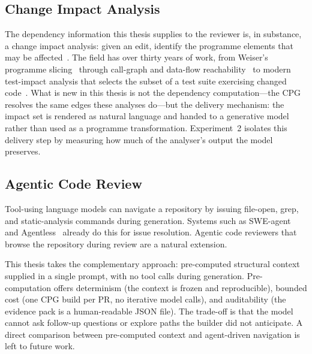 \subsection{Change Impact Analysis}
\label{sec:sota-cia}

The dependency information this thesis supplies to the reviewer is, in
substance, a change impact analysis: given an edit, identify the programme
elements that may be affected~\cite{bohner1996cia}. The field has over
thirty years of work, from Weiser's programme
slicing~\cite{weiser1984slicing} through call-graph and data-flow
reachability~\cite{ryder2001cia} to modern test-impact analysis that
selects the subset of a test suite exercising changed
code~\cite{legunsen2016testimpact}. What is new in this thesis is not the
dependency computation---the CPG resolves the same edges these analyses
do---but the delivery mechanism: the impact set is rendered as natural
language and handed to a generative model rather than used as a programme
transformation. Experiment~2 isolates this delivery step by measuring how
much of the analyser's output the model preserves.

\subsection{Agentic Code Review}
\label{sec:sota-agentic}

Tool-using language models can navigate a repository by issuing file-open,
grep, and static-analysis commands during generation. Systems such as
SWE-agent~\cite{yang2024sweagent} and
Agentless~\cite{xia2024agentless} already do this for issue resolution.
Agentic code reviewers that browse the repository during review are a
natural extension.

This thesis takes the complementary approach: pre-computed structural
context supplied in a single prompt, with no tool calls during generation.
Pre-computation offers determinism (the context is frozen and reproducible),
bounded cost (one CPG build per PR, no iterative model calls), and
auditability (the evidence pack is a human-readable JSON file). The
trade-off is that the model cannot ask follow-up questions or explore paths
the builder did not anticipate. A direct comparison between pre-computed
context and agent-driven navigation is left to future work.
